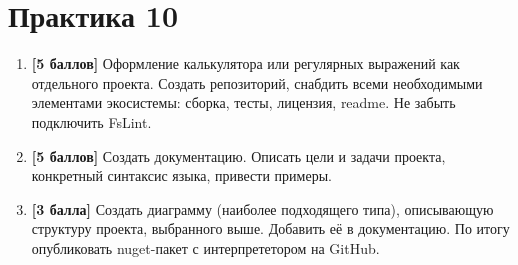 \section{Практика 10}

\begin{enumerate}
    \item \textbf{[5 баллов]} Оформление калькулятора или регулярных выражений как отдельного проекта. Создать репозиторий, снабдить всеми необходимыми элементами экосистемы: сборка, тесты, лицензия, readme. Не забыть подключить FsLint.
    \item \textbf{[5 баллов]} Создать документацию. Описать цели и задачи проекта, конкретный синтаксис языка, привести примеры.
    \item \textbf{[3 балла]} Создать диаграмму (наиболее подходящего типа), описывающую структуру проекта, выбранного выше. Добавить её в документацию. По итогу опубликовать nuget-пакет с интерпрететором на GitHub.
\end{enumerate}
